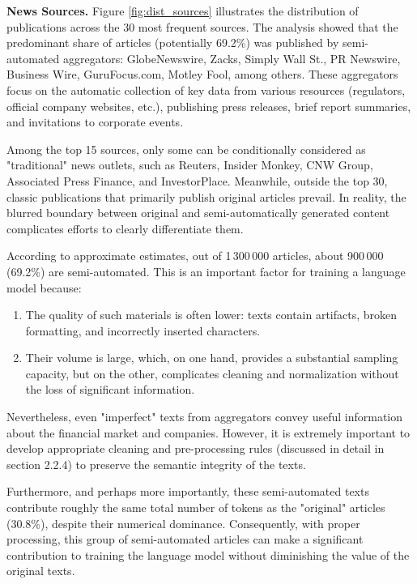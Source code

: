 \textbf{News Sources.} Figure \ref{fig:dist_sources} illustrates the distribution of publications across the 30 most frequent sources.
The analysis showed that the predominant share of articles (potentially 69.2\%) was published by semi-automated aggregators:
GlobeNewswire, Zacks, Simply Wall St., PR Newswire, Business Wire, GuruFocus.com, Motley Fool, among others. These aggregators focus
on the automatic collection of key data from various resources (regulators, official company websites, etc.), publishing press releases,
brief report summaries, and invitations to corporate events.

Among the top 15 sources, only some can be conditionally considered as "traditional" news outlets, such as Reuters, Insider Monkey,
CNW Group, Associated Press Finance, and InvestorPlace. Meanwhile, outside the top 30, classic publications that primarily publish
original articles prevail. In reality, the blurred boundary between original and semi-automatically generated content complicates
efforts to clearly differentiate them.

According to approximate estimates, out of 1\,300\,000 articles, about 900\,000 (69.2\%) are semi-automated. This is an important factor
for training a language model because:

\begin{enumerate}
    \item The quality of such materials is often lower: texts contain artifacts, broken formatting, and incorrectly inserted characters.
    \item Their volume is large, which, on one hand, provides a substantial sampling capacity, but on the other, complicates cleaning and normalization without the loss of significant information.
\end{enumerate}

Nevertheless, even "imperfect" texts from aggregators convey useful information about the financial market and companies. However,
it is extremely important to develop appropriate cleaning and pre-processing rules (discussed in detail in section 2.2.4) to preserve
the semantic integrity of the texts.

Furthermore, and perhaps more importantly, these semi-automated texts contribute roughly the same total number of tokens
as the "original" articles (30.8\%), despite their numerical dominance. Consequently, with proper processing, this group of semi-automated
articles can make a significant contribution to training the language model without diminishing the value of the original texts.

